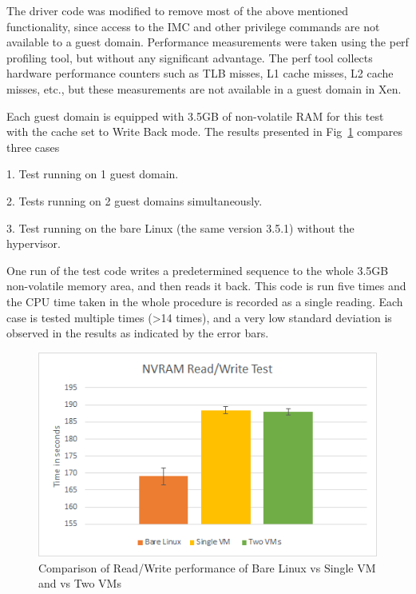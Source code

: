 The driver code was modified to remove most of the above mentioned functionality, since access to the IMC and other privilege commands are not available to a guest domain. Performance measurements were taken using the perf profiling tool, but without any significant advantage. The perf tool collects hardware performance counters such as TLB misses, L1 cache misses, L2 cache misses, etc., but these measurements are not available in a guest domain in Xen.

Each guest domain is equipped with 3.5GB of non-volatile RAM for this test with the cache set to Write Back mode. The results presented in Fig~\ref{fig:result_fig} compares three cases

1. Test running on 1 guest domain.

2. Tests running on 2 guest domains simultaneously.

3. Test running on the bare Linux (the same version 3.5.1) without the hypervisor.

One run of the test code writes a predetermined sequence to the whole 3.5GB non-volatile memory area, and then reads it back. This code is run five times and the CPU time taken in the whole procedure is recorded as a single reading. Each case is tested multiple times (>14 times), and a very low standard deviation is observed in the results as indicated by the error bars. 


\begin{figure}[H]
\centering
\includegraphics{figures/read_write_test.png}
\caption{Comparison of Read/Write performance of Bare Linux vs Single VM and vs Two VMs}
\label{fig:result_fig}
\end{figure}



